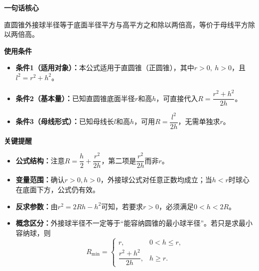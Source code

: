 \begin{summarybox}

	\textbf{\textcolor{CSummary}{一句话核心}}

	直圆锥外接球半径等于底面半径平方与高平方之和除以两倍高，等价于母线平方除以两倍高。

	\medskip
	\textbf{\textcolor{CSummary}{使用条件}}
	\begin{itemize}[leftmargin=*, itemsep=0.5em, topsep=0.4em]
		\item \textbf{条件1（适用对象）：}本公式适用于直圆锥（正圆锥），其中$r>0,\ h>0$，且$l^2=r^2+h^2$。
		\item \textbf{条件2（基本量）：}已知直圆锥底面半径$r$和高$h$，可直接代入$R = \dfrac{r^2+h^2}{2h}$。
		\item \textbf{条件3（母线形式）：}已知母线长$l$和高$h$，可用$R = \dfrac{l^2}{2h}$，无需单独求$r$。
	\end{itemize}

	\medskip
	\textbf{\textcolor{CSummary}{关键提醒}}
	\begin{itemize}[leftmargin=*, itemsep=0.5em, topsep=0.4em]
		\item \textbf{公式结构：}注意$R = \dfrac{h}{2} + \dfrac{r^2}{2h}$，第二项是$\dfrac{r^2}{2h}$而非$r$。
		\item \textbf{变量范围：}确认$r>0,h>0$，外接球公式对任意正数均成立；当$h<r$时球心在底面下方，公式仍有效。
		\item \textbf{反求参数：}由$r^2=2Rh-h^2$可知，若要求$r>0$，必须满足$0<h<2R$。
		\item \textbf{概念区分：}外接球半径不一定等于“能容纳圆锥的最小球半径”。若只是求最小容纳球，则
		      \[
			      R_{\min}=\begin{cases}
				      r,                   & 0<h\le r, \\[4pt]
				      \dfrac{r^2+h^2}{2h}, & h\ge r.
			      \end{cases}
		      \]
	\end{itemize}
\end{summarybox}
